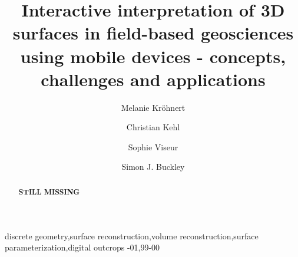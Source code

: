 \documentclass[review]{elsarticle}
\begin{document}
\setlength\emergencystretch{1.5em}

\begin{frontmatter}

\title{Interactive interpretation of 3D surfaces in field-based geosciences using mobile devices - concepts, challenges and applications}



\author[tudresden]{Melanie Kr\"{o}hnert}

\author[dtu]{Christian Kehl}


\author[cerege]{Sophie Viseur}

\author[uniresearch,uib]{Simon J. Buckley}

\address[tudresden]{Institute for Photogrammetry \& Remote Sensing, TU Dresden, Helmholtzstr. 10, 01069 Dresden, Germany}
\address[cerege]{Aix Marseille Universit\'{e}, CNRS, IRD, \gls{CEREGE} UM 34, Dept. Sedimentary and Reservoir Systems, 13001 Marseille, France}
\address[uniresearch]{Uni Research AS -- CIPR, Nyg{\aa}rdsgaten 112, 5008 Bergen, Norway}
\address[uib]{Department of Earth Science, University of Bergen, All\'{e}gaten 41, 5007 Bergen, Norway}
\address[dtu]{Danmarks Tekniske Universitet, DTU Compute, Richard Petersens Plads, Building 321/208, 2800 Kongens Lyngby, Denmark}


\begin{abstract}
\textbf{STILL MISSING}
\end{abstract}



\begin{keyword}
discrete geometry\sep surface reconstruction\sep volume reconstruction\sep surface parameterization\sep digital outcrops
-01\sep  99-00
\end{keyword}

\end{frontmatter}
\end{document}

